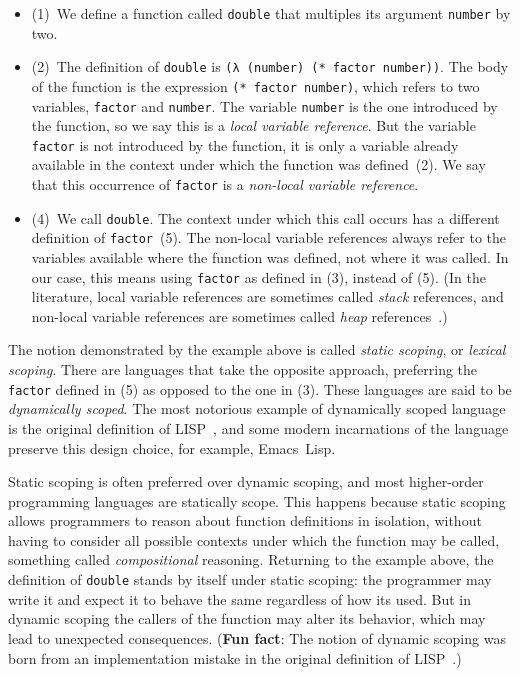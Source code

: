\documentclass[12pt, oneside]{book}
\begin{document}
\begin{itemize}
  \item (1)~We define a function called \texttt{double} that multiples its argument \texttt{number} by two.
  \item (2)~The definition of \texttt{double} is \texttt{(λ (number) (* factor number))}. The body of the function is the expression \texttt{(* factor number)}, which refers to two variables, \texttt{factor} and \texttt{number}. The variable \texttt{number} is the one introduced by the function, so we say this is a \emph{local variable reference}. But the variable \texttt{factor} is not introduced by the function, it is only a variable already available in the context under which the function was defined~(2). We say that this occurrence of \texttt{factor} is a \emph{non-local variable reference}.
  \item (4)~We call \texttt{double}. The context under which this call occurs has a different definition of \texttt{factor}~(5). The non-local variable references always refer to the variables available where the function was defined, not where it was called. In our case, this means using \texttt{factor} as defined in (3), instead of (5). (In the literature, local variable references are sometimes called \emph{stack} references, and non-local variable references are sometimes called \emph{heap} references~\cite{cfa2}.)
\end{itemize}

The notion demonstrated by the example above is called \emph{static scoping}, or \emph{lexical scoping}. There are languages that take the opposite approach, preferring the \texttt{factor} defined in (5) as opposed to the one in (3). These languages are said to be \emph{dynamically scoped}. The most notorious example of dynamically scoped language is the original definition of LISP~\cite{original-lisp-paper}, and some modern incarnations of the language preserve this design choice, for example, Emacs~Lisp.

Static scoping is often preferred over dynamic scoping, and most higher-order programming languages are statically scope. This happens because static scoping allows programmers to reason about function definitions in isolation, without having to consider all possible contexts under which the function may be called, something called \emph{compositional} reasoning. Returning to the example above, the definition of \texttt{double} stands by itself under static scoping: the programmer may write it and expect it to behave the same regardless of how its used. But in dynamic scoping the callers of the function may alter its behavior, which may lead to unexpected consequences. (\textbf{Fun fact}: The notion of dynamic scoping was born from an implementation mistake in the original definition of LISP~\cite{history-of-lisp}.)
\end{document}
